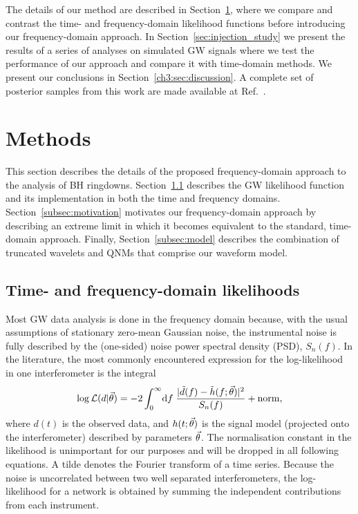 The details of our method are described in Section~\ref{sec:methods}, where we compare and contrast the time- and frequency-domain likelihood functions before introducing our frequency-domain approach.
In Section~\ref{sec:injection_study} we present the results of a series of analyses on simulated GW signals where we test the performance of our approach and compare it with time-domain methods.
We present our conclusions in Section~\ref{ch3:sec:discussion}.
A complete set of posterior samples from this work are made available at Ref.~\cite{finch_eliot_2021_5569759}.


\section{Methods}\label{sec:methods}

This section describes the details of the proposed frequency-domain approach to the analysis of BH ringdowns. 
Section~\ref{subsec:data_analysis} describes the GW likelihood function and its implementation in both the time and frequency domains.
Section~\ref{subsec:motivation} motivates our frequency-domain approach by describing an extreme limit in which it becomes equivalent to the standard, time-domain approach.
Finally, Section~\ref{subsec:model} describes the combination of truncated wavelets and QNMs that comprise our waveform model.


\subsection{Time- and frequency-domain likelihoods}\label{subsec:data_analysis}

Most GW data analysis is done in the frequency domain because, with the usual assumptions of stationary zero-mean Gaussian noise, the instrumental noise is fully described by the (one-sided) noise power spectral density (PSD), $S_n(f)$.
In the literature, the most commonly encountered expression for the log-likelihood in one interferometer is the integral
\begin{align} \label{eq:logL_FD_continuous}
	\log\mathcal{L}(d|\vec{\theta}) = -2\int_{0}^{\infty}\!\mathrm{d}f\;\frac{|\tilde{d}(f)-\tilde{h}(f;\vec{\theta})|^2}{S_n(f)} + \mathrm{norm},
\end{align}
where $d(t)$ is the observed data, and $h(t;\vec{\theta})$ is the signal model (projected onto the interferometer) described by parameters $\vec{\theta}$.
The normalisation constant in the likelihood is unimportant for our purposes and will be dropped in all following equations.
A tilde denotes the Fourier transform of a time series.
Because the noise is uncorrelated between two well separated interferometers, the log-likelihood for a network is obtained by summing the independent contributions from each instrument.

